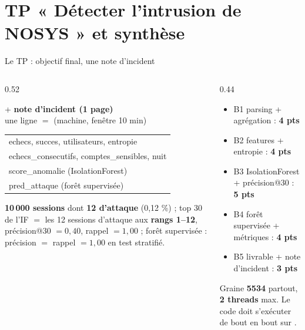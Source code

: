 \section{TP « Détecter l'intrusion de NOSYS » et synthèse}

\begin{frame}{Le TP : objectif final, une note d'incident}
\begin{columns}[t]
\begin{column}{0.52\textwidth}
\begin{kbox}
\begin{center}
 + \textbf{note d'incident (1 page)}\\[1mm]
une ligne $=$ (machine, fenêtre 10 min)\\[1mm]
\begin{tabular}{@{}l@{}}
\toprule
echecs, succes, utilisateurs, entropie\\
echecs\_consecutifs, comptes\_sensibles, nuit\\
score\_anomalie (IsolationForest)\\
pred\_attaque (forêt supervisée)\\
\bottomrule
\end{tabular}
\end{center}
\end{kbox}
\begin{ebox}
\textbf{10\,000 sessions} dont \textbf{12 d'attaque} (0,12 \%) ;
top 30 de l'IF $=$ les 12 sessions d'attaque aux \textbf{rangs 1--12},
précision@30 $= 0{,}40$, rappel $= 1{,}00$ ; forêt supervisée :
précision $=$ rappel $= 1{,}00$ en test stratifié.
\end{ebox}
\end{column}
\begin{column}{0.44\textwidth}
\begin{wbox}
\begin{itemize}
\item B1 parsing + agrégation : \textbf{4 pts}
\item B2 features + entropie : \textbf{4 pts}
\item B3 IsolationForest + précision@30 : \textbf{5 pts}
\item B4 forêt supervisée + métriques : \textbf{4 pts}
\item B5 livrable + note d'incident : \textbf{3 pts}
\end{itemize}
Graine \textbf{5534} partout, \textbf{2 threads} max. Le code doit
s'exécuter de bout en bout sur .
\end{wbox}
\end{column}
\end{columns}
\end{frame}


